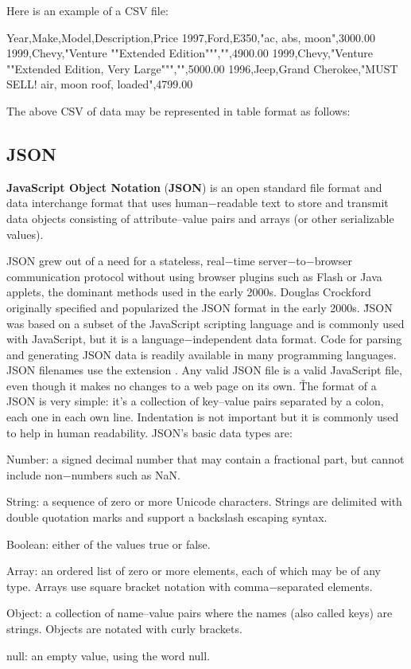 Here is an example of a CSV file:

\begin{block}
Year,Make,Model,Description,Price
1997,Ford,E350,"ac, abs, moon",3000.00
1999,Chevy,"Venture ""Extended Edition""","",4900.00
1999,Chevy,"Venture ""Extended Edition, Very Large""","",5000.00
1996,Jeep,Grand Cherokee,"MUST SELL! air, moon roof, loaded",4799.00
\end{block}

The above CSV of data may be represented in table format as follows:


\subsection{JSON}


\textbf{JavaScript Object Notation} (\textbf{JSON}) is an open standard file format and data interchange format that
uses human$-$readable text to store and transmit data objects consisting of attribute–value pairs and arrays (or other
serializable values).
\ed

JSON grew out of a need for a stateless, real$-$time server$-$to$-$browser communication protocol without using
browser plugins such as Flash or Java applets, the dominant methods used in the early 2000s. Douglas Crockford
originally specified and popularized the JSON format in the early 2000s. \v

JSON was based on a subset of the JavaScript scripting language and is commonly used with JavaScript, but it is a
language$-$independent data format. Code for parsing and generating JSON data is readily available in many
programming languages. JSON filenames use the extension . Any valid JSON file is a valid JavaScript file,
even though it makes no changes to a web page on its own. \v

The format of a JSON is very simple: it's a collection of key–value pairs separated by a colon, each one in each own
line. Indentation is not important but it is commonly used to help in human readability. JSON's basic data types are:
\bit
\item Number: a signed decimal number that may contain a fractional part, but cannot include non$-$numbers such as NaN\@.
\item String: a sequence of zero or more Unicode characters. Strings are delimited with double quotation marks and
support a backslash escaping syntax.
\item Boolean: either of the values true or false.
\item Array: an ordered list of zero or more elements, each of which may be of any type. Arrays use square bracket
notation with comma$-$separated elements.
\item Object: a collection of name–value pairs where the names (also called keys) are strings. Objects are notated with
curly brackets.
\item null: an empty value, using the word null.
\eit

